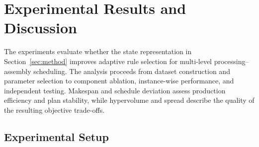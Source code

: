 \section{Experimental Results and Discussion}
\label{sec:experiments}

The experiments evaluate whether the state representation in Section~\ref{sec:method} improves adaptive
rule selection for multi-level processing--assembly scheduling. The analysis proceeds from dataset construction
and parameter selection to component ablation, instance-wise performance, and independent testing.
Makespan and schedule deviation assess production efficiency and plan stability, while hypervolume
and spread describe the quality of the resulting objective trade-offs.


\subsection{Experimental Setup}
\label{subsec:settings}

